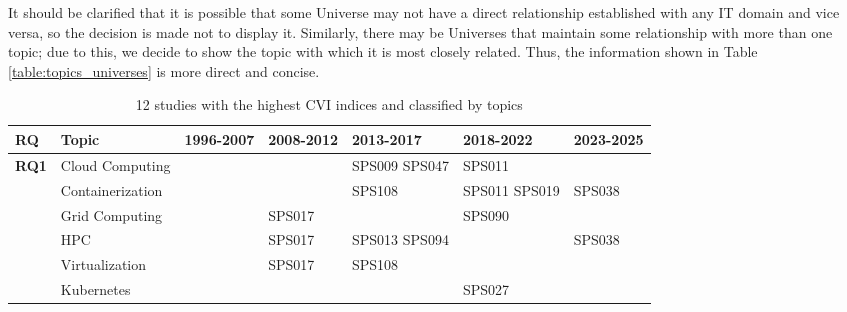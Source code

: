 It should be clarified that it is possible that some Universe may not have a direct relationship established with any IT domain and vice versa, so the decision is made not to display it. Similarly, there may be Universes that maintain some relationship with more than one topic; due to this, we decide to show the topic with which it is most closely related. Thus, the information shown in Table \ref{table:topics_universes} is more direct and concise.


\begin{table*}[htbp]
	\centering
	\caption{12 studies with the highest CVI indices and classified by topics}
	\label{table:highest_CVI}
	\renewcommand{\arraystretch}{1.2}
	\setlength{\tabcolsep}{6pt}
	\begin{tabularx}{\textwidth}{p{0.8cm}p{2.5cm}>{\raggedright\arraybackslash}X>{\raggedright\arraybackslash}X>{\raggedright\arraybackslash}X>{\raggedright\arraybackslash}X>{\raggedright\arraybackslash}X}
		\toprule
		\textbf{RQ}                          & \textbf{Topic}  & \textbf{1996-2007} & \textbf{2008-2012} & \textbf{2013-2017} & \textbf{2018-2022} & \textbf{2023-2025} \\
		\midrule
		\multirow{12}{*}[0em]{\textbf{RQ1}}  & Cloud Computing  &                    &                    & SPS009 SPS047      & SPS011             &                    \\
		\addlinespace[0.3em]
		                                     & Containerization &                    &                    & SPS108             & SPS011 SPS019      & SPS038             \\
		\addlinespace[0.3em]
		                                     & Grid Computing   &                    & SPS017             &                    & SPS090             &                    \\
		\addlinespace[0.3em]
		                                     & HPC              &                    & SPS017             & SPS013 SPS094      &                    & SPS038             \\
		\addlinespace[0.3em]
		                                     & Virtualization   &                    & SPS017             & SPS108             &                    &                    \\
		\addlinespace[0.3em]
		                                     & Kubernetes       &                    &                    &                    & SPS027             &                    \\

\end{tabularx}
\end{table*}
